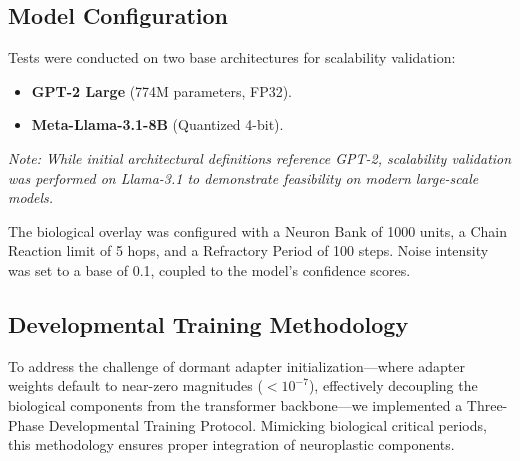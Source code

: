 \documentclass[11pt, letterpaper]{article}
\begin{document}
\subsection{Model Configuration}
Tests were conducted on two base architectures for scalability validation:
\begin{itemize}
    \item \textbf{GPT-2 Large} (774M parameters, FP32).
    \item \textbf{Meta-Llama-3.1-8B} (Quantized 4-bit).
\end{itemize}
\textit{Note: While initial architectural definitions reference GPT-2, 
scalability validation was performed on Llama-3.1 to demonstrate feasibility on modern large-scale models.}

The biological overlay was configured with a Neuron Bank of 1000 units, a Chain Reaction limit of 5 hops, and a Refractory Period of 100 steps. Noise intensity was set to a base of 0.1, coupled to the model's confidence scores.

\subsection{Developmental Training Methodology}
To address the challenge of dormant adapter initialization—where 
adapter weights default to near-zero magnitudes ($< 10^{-7}$), effectively 
decoupling the biological components from the transformer backbone—we 
implemented a Three-Phase Developmental Training Protocol. Mimicking biological critical periods, this methodology ensures proper integration of neuroplastic components.
\end{document}

